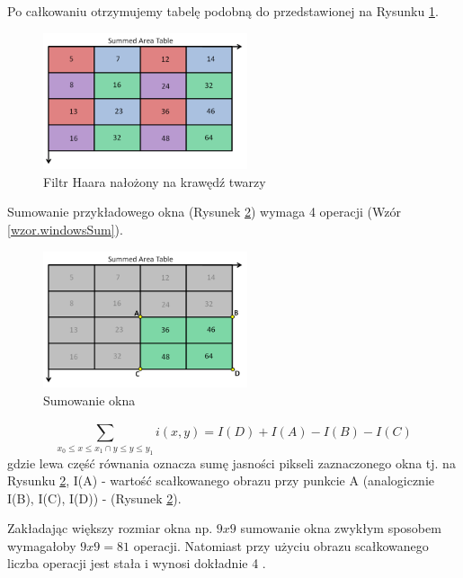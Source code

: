\documentclass[a4paper,twoside,12pt]{book}
\begin{document}
    Po całkowaniu otrzymujemy tabelę podobną do przedstawionej na Rysunku \ref{fig.poCalkowaniu}.
    \begin{figure}
        \centering
        \includegraphics[width=6cm]{Obrazy/poCalkowaniu.jpg}
        \caption{Filtr Haara nałożony na krawędź twarzy \cite{integralImages}}
        \label{fig.poCalkowaniu}
    \end{figure}

    Sumowanie przykładowego okna (Rysunek \ref{fig.sumowanieOkna}) wymaga 4 operacji (Wzór \ref{wzor.windowsSum}).
    \begin{figure}
        \centering
        \includegraphics[width=6cm]{Obrazy/sumowanieOkna.jpg}
        \caption{Sumowanie okna \cite{integralImages}}
        \label{fig.sumowanieOkna}
    \end{figure}


    \large
    \begin{equation}
        \sum_{x_0\leq x \leq x_1\cap {y}\leq y \leq y_1}^{} i(x,y) = I(D) + I(A) - I(B) - I(C)
        \label{wzor.windowsSum}
    \end{equation}
    \normalsize
    gdzie lewa część równania oznacza sumę jasności pikseli
    zaznaczonego okna tj.
    na Rysunku \ref{fig.sumowanieOkna}, I(A) - wartość scałkowanego obrazu przy punkcie A
    (analogicznie I(B), I(C), I(D)) - (Rysunek \ref{fig.sumowanieOkna}).

    Zakładając większy rozmiar okna np. \begin{math}
                                            9x9
    \end{math} sumowanie okna zwykłym sposobem
    wymagałoby \begin{math}
                   9x9=81
    \end{math} operacji.
    Natomiast przy użyciu obrazu scałkowanego liczba operacji jest
    stała i wynosi dokładnie 4 \cite{violaJones}.
\end{document}
